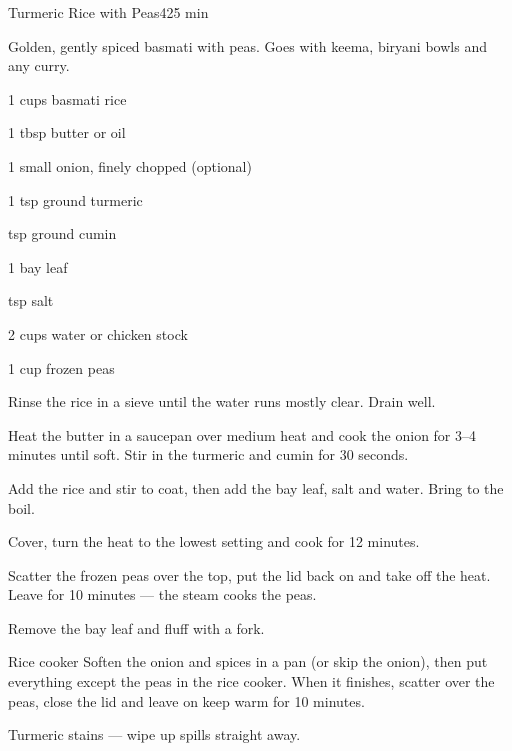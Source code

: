 \begin{recipebox}{Turmeric Rice with Peas}{4}{25 min}

Golden, gently spiced basmati with peas. Goes with keema, biryani bowls and
any curry.

\begin{ingredients}
  \item 1 cups basmati rice
  \item 1 tbsp butter or oil
  \item 1 small onion, finely chopped (optional)
  \item 1 tsp ground turmeric
  \item {} tsp ground cumin
  \item 1 bay leaf
  \item {} tsp salt
  \item 2 cups water or chicken stock
  \item 1 cup frozen peas
\end{ingredients}

\begin{method}
  \item Rinse the rice in a sieve until the water runs mostly clear. Drain well.
  \item Heat the butter in a saucepan over medium heat and cook the onion for 3--4 minutes until soft. Stir in the turmeric and cumin for 30 seconds.
  \item Add the rice and stir to coat, then add the bay leaf, salt and water. Bring to the boil.
  \item Cover, turn the heat to the lowest setting and cook for 12 minutes.
  \item Scatter the frozen peas over the top, put the lid back on and take off the heat. Leave for 10 minutes --- the steam cooks the peas.
  \item Remove the bay leaf and fluff with a fork.
\end{method}

\begin{variationbox}{Rice cooker}
Soften the onion and spices in a pan (or skip the onion), then put everything except the peas in the rice cooker. When it finishes, scatter over the peas, close the lid and leave on keep warm for 10 minutes.
\end{variationbox}

\begin{notelist}
  \item Turmeric stains --- wipe up spills straight away.
\end{notelist}

\end{recipebox}
